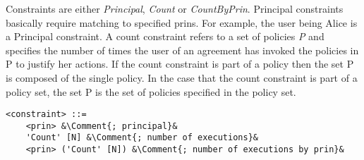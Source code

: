 Constraints are either \emph{Principal}, \emph{Count} or \emph{CountByPrin}. Principal constraints basically require matching to specified prins. For example, the user being Alice is a Principal constraint. A count constraint refers to a set of policies \emph{P} and specifies the number of times the user of an agreement has invoked the policies in P to justify her actions. If the count constraint is part of a policy then the set P is composed of the single policy. In the case that the count constraint is part of a policy set, the set P is the set of policies specified in the policy set.

\lstset{mathescape, language=AST, escapechar=\&}  
\begin{lstlisting}[frame=single, caption={constraint},label={lst:constraintast}]
<constraint> ::=  
	<prin> &\Comment{; principal}&
	'Count' [N] &\Comment{; number of executions}&
	<prin> ('Count' [N]) &\Comment{; number of executions by prin}&
\end{lstlisting}
